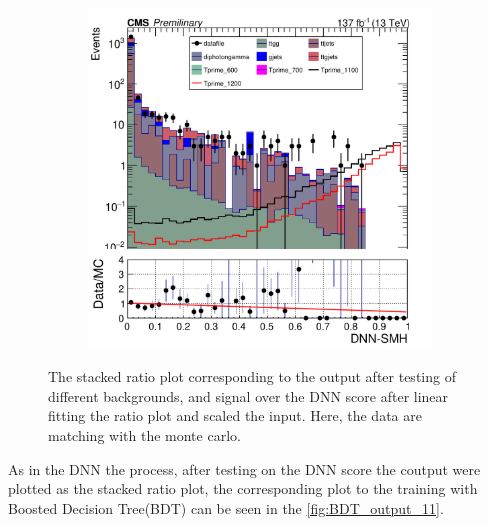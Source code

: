 \begin{figure}[H]
\begin{subfigure}[b]{0.3\textwidth}
         \label{fig:three sin x}
     \end{subfigure}
    \hfill
     \begin{subfigure}[b]{0.3\textwidth}
         \centering
         \includegraphics[width=\textwidth]{figure_4/Stacked_plot_DNN_1100-1200_with_diphoton_cuts_scaled_inputs.pdf}
         \label{fig:three sin x}
     \end{subfigure}
     \label{fig:stacked_scaled_plot_DNN_200}
     \caption{The stacked ratio plot corresponding to the output after testing of different backgrounds, and signal over the DNN score after linear fitting the ratio plot and scaled the input. Here, the data are matching with the monte carlo.}
\end{figure}



As in the DNN the process, after testing on the DNN score the coutput were plotted as the stacked ratio plot, the corresponding plot to the training with Boosted Decision Tree(BDT) can be seen in the \autoref{fig:BDT_output_11}. 


